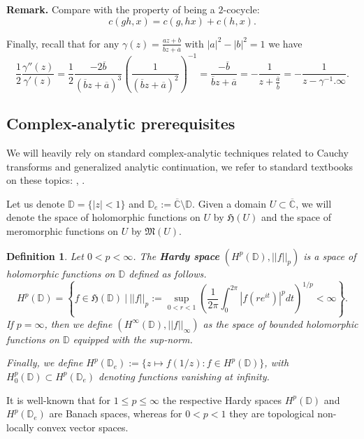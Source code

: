 \documentclass[11pt]{article}
\newtheorem{definition}{Definition}[section]
\begin{document}
\textbf{Remark.} Compare with the property of being a $2$-cocycle:
\[
c(gh, x) = c(g, hx) + c(h, x).
\]

Finally, recall that for any $\gamma(z) = \frac{a z + b}{\overline{b} z + \overline{a}}$ with $|a|^2 - |b|^2 = 1$ we have
\begin{equation}
	\label{poles of the log derivative}
		\frac{1}{2} \frac{\gamma''(z)}{\gamma'(z)} = \frac{1}{2} \frac{-2\overline{b}}{(\overline{b}z + \overline{a})^3} \left( \frac{1}{(\overline{b}z + \overline{a})^2}\right)^{-1} = \frac{- \overline{b}}{\overline{b}z + \overline{a}} = - \frac{1}{z + \frac{\overline{a}}{\overline{b}}} = - \frac{1}{z - \gamma^{-1}.\infty}.
\end{equation}

\subsection{Complex-analytic prerequisites}
We will heavily rely on standard complex-analytic techniques related to Cauchy transforms and generalized analytic continuation, we refer to standard textbooks on these topics: \cite{Shapiro1968}, \cite{book:738388}.

Let us denote $\mathbb{D} = \{ |z| < 1 \}$ and $\mathbb{D}_e := \overline{\mathbb{C}} \setminus \mathbb{D}$. Given a domain $U \subset \overline{\mathbb{C}}$, we will denote the space of holomorphic functions on $U$ by $\mathfrak{H}(U)$ and the space of meromorphic functions on $U$ by $\mathfrak{M}(U)$.

\begin{definition}
	Let $0 < p < \infty$. The \textbf{Hardy space} $(H^p(\mathbb{D}), ||f||_p)$ is a space of holomorphic functions on $\mathbb{D}$ defined as follows.
	\[
	H^p(\mathbb{D}) = \left\lbrace  f \in \mathfrak{H}(\mathbb{D}) \ | \ ||f||_p := \sup_{0 < r < 1} \left( \frac{1}{2 \pi} \int_{0}^{2 \pi} |f(r e^{it})|^p dt \right)^{1/p} < \infty \right\rbrace.
	\] 
	If $p = \infty$, then we define $(H^\infty(\mathbb{D}), ||f||_\infty)$ as the space of bounded holomorphic functions on $\mathbb{D}$ equipped with the sup-norm.
	
	Finally, we define $H^p(\mathbb{D}_e) := \{ z \mapsto f(1/z) : f \in H^p(\mathbb{D})\}$, with $H^p_0(\mathbb{D}) \subset H^p(\mathbb{D}_e)$ denoting functions vanishing at infinity.
\end{definition} 

It is well-known that for $1 \le p \le \infty$ the respective Hardy spaces $H^p(\mathbb{D})$ and $H^p(\mathbb{D}_e)$ are Banach spaces, whereas for $0 < p < 1$ they are topological non-locally convex vector spaces.
\end{document}
